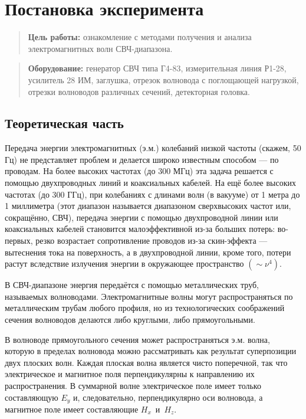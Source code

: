 \documentclass{lab}
\begin{document}
	

\section*{Постановка эксперимента}
\begin{quote}
	\textbf{{\normalsize Цель работы: }}
	ознакомление с методами получения и анализа электромагнитных волн СВЧ-диапазона.
\end{quote}
\begin{quote}
	\textbf{{\normalsize Оборудование: }}
	генератор СВЧ типа Г4-83, измерительная линия Р1-28, усилитель 28 ИМ, заглушка, отрезок
	волновода с поглощающей нагрузкой, отрезки волноводов различных сечений, детекторная
	головка.
\end{quote}

\subsection*{Теоретическая часть}
\hspace{\parindent}
Передача энергии электромагнитных (э.м.) колебаний низкой частоты
(скажем, 50 Гц) не представляет проблем и делается широко известным
способом — по проводам. На более высоких частотах (до 300 МГц) эта
задача решается с помощью двухпроводных линий и коаксиальных кабелей.
На ещё более высоких частотах (до 300 ГГц), при колебаниях с
длинами волн (в вакууме) от 1 метра до 1 миллиметра (этот диапазон
называется диапазоном сверхвысоких частот или, сокращённо, СВЧ),
передача энергии с помощью двухпроводной линии или коаксиальных
кабелей становится малоэффективной из-за больших потерь: во-первых,
резко возрастает сопротивление проводов из-за скин-эффекта — вытеснения
тока на поверхность, а в двухпроводной линии, кроме
того, потери растут вследствие излучения энергии в окружающее пространство $(\sim \nu^4)$.

В СВЧ-диапазоне энергия передаётся с помощью металлических труб,
называемых волноводами. Электромагнитные волны
могут распространяться по металлическим трубам любого профиля,
но из технологических соображений сечения волноводов делаются либо
круглыми, либо прямоугольными.

В волноводе прямоугольного сечения может распространяться э.м. волна,
которую в пределах волновода можно рассматривать как результат суперпозиции двух плоских волн.
Каждая плоская волна является чисто поперечной, так что электрическое и магнитное поля
перпендикулярны к направлению их распространения. В суммарной волне электрическое поле имеет
только составляющую $E_y$ и, следовательно, перпендикулярно оси волновода,
а магнитное поле имеет составляющие $H_x$~и~$H_z$.
\end{document}
